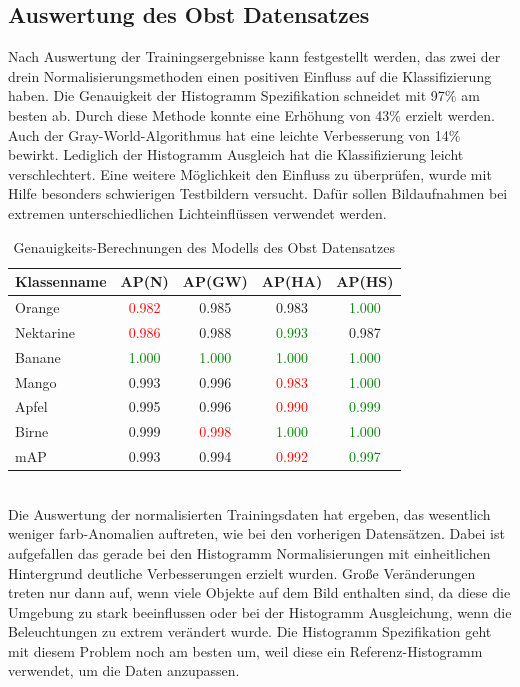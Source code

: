 \documentclass[a4paper,12pt,oneside]{article}
\begin{document}
\subsection{Auswertung des Obst Datensatzes}
Nach Auswertung der Trainingsergebnisse kann festgestellt werden, das zwei der drein Normalisierungsmethoden einen positiven Einfluss auf die Klassifizierung haben. Die Genauigkeit der Histogramm Spezifikation schneidet mit 97\% am besten ab. Durch diese Methode konnte eine Erhöhung von 43\% erzielt werden. Auch der Gray-World-Algorithmus hat eine leichte Verbesserung von 14\% bewirkt. Lediglich der Histogramm Ausgleich hat die Klassifizierung leicht verschlechtert. Eine weitere Möglichkeit den Einfluss zu überprüfen, wurde mit Hilfe besonders schwierigen Testbildern versucht. Dafür sollen Bildaufnahmen bei extremen unterschiedlichen Lichteinflüssen verwendet werden.
\begin{table}
[h]
\caption{Genauigkeits-Berechnungen des Modells des Obst Datensatzes}
\centering
\begin{tabular}{|l|c|c|c|c|}
\hline
Klassenname & AP(N) & AP(GW) & AP(HA) & AP(HS)\\
\hline
Orange & \textcolor{red}{0.982} & 0.985 & 0.983 & \textcolor{green}{1.000}\\
Nektarine & \textcolor{red}{0.986} & 0.988 & \textcolor{green}{0.993} & 0.987\\
Banane & \textcolor{green}{1.000} & \textcolor{green}{1.000} & \textcolor{green}{1.000} & \textcolor{green}{1.000}\\
Mango & 0.993 & 0.996 & \textcolor{red}{0.983} & \textcolor{green}{1.000}\\
Apfel & 0.995 & 0.996 & \textcolor{red}{0.990} & \textcolor{green}{0.999}\\
Birne & 0.999 & \textcolor{red}{0.998} & \textcolor{green}{1.000} & \textcolor{green}{1.000}\\
\hline
mAP & 0.993 & 0.994 & \textcolor{red}{0.992} & \textcolor{green}{0.997}\\
\hline
\end{tabular}
\end{table}\\
Die Auswertung der normalisierten Trainingsdaten hat ergeben, das wesentlich weniger farb-Anomalien auftreten, wie bei den vorherigen Datensätzen. Dabei ist aufgefallen das gerade bei den Histogramm Normalisierungen mit einheitlichen Hintergrund deutliche Verbesserungen erzielt wurden. Große Veränderungen treten nur dann auf, wenn viele Objekte auf dem Bild enthalten sind, da diese die Umgebung zu stark beeinflussen oder bei der Histogramm Ausgleichung, wenn die Beleuchtungen zu extrem verändert wurde. Die Histogramm Spezifikation geht mit diesem Problem noch am besten um, weil diese ein Referenz-Histogramm verwendet, um die Daten anzupassen. \\\\
\end{document}

